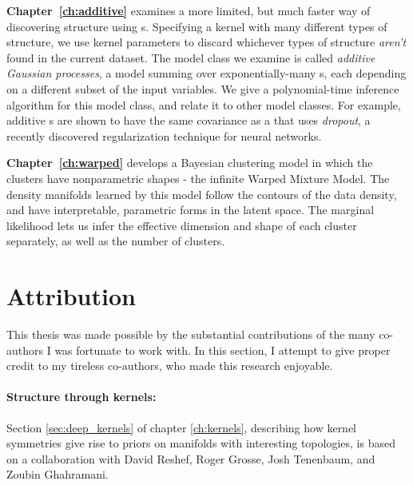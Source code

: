 {\bf Chapter~\ref{ch:additive}} examines a more limited, but much faster way of discovering structure using \gp{}s.
Specifying a kernel with many different types of structure, we use kernel parameters to discard whichever types of structure \emph{aren't} found in the current dataset.
The model class we examine is called \emph{additive Gaussian processes}, a model summing over exponentially-many \gp{}s, each depending on a different subset of the input variables.
We give a polynomial-time inference algorithm for this model class, and relate it to other model classes.
For example, additive \gp{}s are shown to have the same covariance as a \gp{} that uses \emph{dropout}, a recently discovered regularization technique for neural networks.

{\bf Chapter~\ref{ch:warped}} develops a Bayesian clustering model in which the clusters have nonparametric shapes - the infinite Warped Mixture Model.
The density manifolds learned by this model follow the contours of the data density, and have interpretable, parametric forms in the latent space.
The marginal likelihood lets us infer the effective dimension and shape of each cluster separately, as well as the number of clusters.



\iffalse

\section{Attribution}

This thesis was made possible by the substantial contributions of the many co-authors I was fortunate to work with.
In this section, I attempt to give proper credit to my tireless co-authors, who made this research enjoyable.

\paragraph{Structure through kernels:}
Section \ref{sec:deep_kernels} of chapter \ref{ch:kernels}, describing how kernel symmetries give rise to priors on manifolds with interesting topologies, is based on a collaboration with David Reshef, Roger Grosse, Josh Tenenbaum, and Zoubin Ghahramani.

